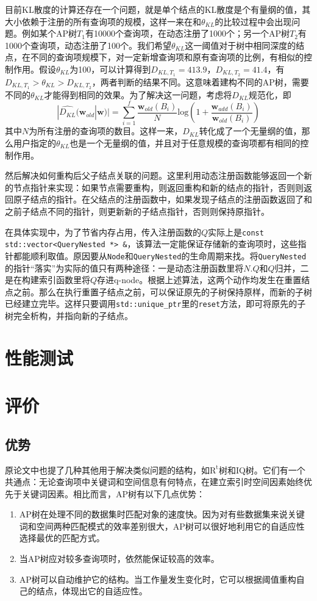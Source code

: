 \documentclass[UTF8]{ctexart}
\begin{document}
目前KL散度的计算还存在一个问题，就是单个结点的KL散度是个有量纲的值，其大小依赖于注册的所有查询项的规模，这样一来在和$\theta_{KL}$的比较过程中会出现问题。例如某个AP树$T_1$有10000个查询项，在动态注册了1000个；另一个AP树$T_2$有1000个查询项，动态注册了100个。我们希望$\theta_{KL}$这一阈值对于树中相同深度的结点，在不同的查询项规模下，对一定新增查询项和原有查询项的比例，有相似的控制作用。假设$\theta_{KL}$为100，可以计算得到$D_{KL,T_1}=413.9$，$D_{KL,T_2}=41.4$，有$D_{KL,T_1} > \theta_{KL} > D_{KL,T_2}$，两者判断的结果不同。这意味着建构不同的AP树，需要不同的$\theta_{KL}$才能得到相同的效果。为了解决这一问题，考虑将$D_{KL}$规范化，即
\[|\widehat{D_{KL}}(\textbf{w}_{old}|\textbf{w})| = \sum_{i=1}^f \frac{\textbf{w}_{old}(B_i)}{N}\mathrm{log}(1 + \frac{\textbf{w}_{add}(B_i)}{\textbf{w}_{old}(B_i)})\]
其中$N$为所有注册的查询项的数目。这样一来，$D_{KL}$转化成了一个无量纲的值，那么用户指定的$\theta_{KL}$也是一个无量纲的值，并且对于任意规模的查询项都有相同的控制作用。

然后解决如何重构后父子结点关联的问题。这里利用动态注册函数能够返回一个新的节点指针来实现：如果节点需要重构，则返回重构和新的结点的指针，否则则返回原子结点的指针。在父结点的注册函数中，如果发现子结点的注册函数返回了和之前子结点不同的指针，则更新新的子结点指针，否则则保持原指针。

在具体实现中，为了节省内存占用，传入注册函数的$Q$实际上是\texttt{const std::vector<QueryNested *> \&}，该算法一定能保证存储新的查询项时，这些指针都能顺利取值。原因要从\texttt{Node}和\texttt{QueryNested}的生命周期来找。将\texttt{QueryNested}的指针“落实”为实际的值只有两种途径：一是动态注册函数里将$N.Q$和$Q$归并，二是在构建索引函数里将$Q$存进q-node。根据上述算法，这两个动作均发生在重置结点之前。那么在执行重置子结点之前，可以保证原先的子树保持原样，而新的子树已经建立完毕。这样只要调用\texttt{std::unique\_ptr}里的\texttt{reset}方法，即可将原先的子树完全析构，并指向新的子结点。

\section{性能测试}


\section{评价}
\subsection{优势}
原论文中也提了几种其他用于解决类似问题的结构，如$\mathrm{R^t}$树和IQ树。它们有一个共通点：无论查询项中关键词和空间信息有何特点，在建立索引时空间因素始终优先于关键词因素。相比而言，AP树有以下几点优势：
\begin{enumerate}
    \item AP树在处理不同的数据集时匹配对象的速度快。因为对有些数据集来说关键词和空间两种匹配模式的效率差别很大，AP树可以很好地利用它的自适应性选择最优的匹配方式。
    \item 当AP树应对较多查询项时，依然能保证较高的效率。
    \item AP树可以自动维护它的结构。当工作量发生变化时，它可以根据阈值重构自己的结点，体现出它的自适应性。
\end{enumerate}
\end{document}
